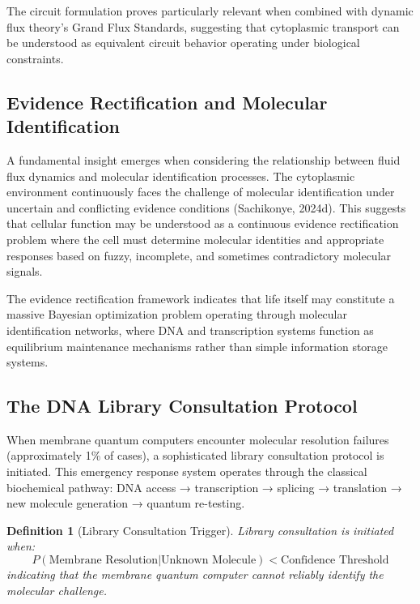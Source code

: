 \documentclass[12pt,a4paper]{article}
\newtheorem{definition}{Definition}
\begin{document}
The circuit formulation proves particularly relevant when combined with dynamic flux theory's Grand Flux Standards, suggesting that cytoplasmic transport can be understood as equivalent circuit behavior operating under biological constraints.

\subsection{Evidence Rectification and Molecular Identification}

A fundamental insight emerges when considering the relationship between fluid flux dynamics and molecular identification processes. The cytoplasmic environment continuously faces the challenge of molecular identification under uncertain and conflicting evidence conditions (Sachikonye, 2024d). This suggests that cellular function may be understood as a continuous evidence rectification problem where the cell must determine molecular identities and appropriate responses based on fuzzy, incomplete, and sometimes contradictory molecular signals.

The evidence rectification framework indicates that life itself may constitute a massive Bayesian optimization problem operating through molecular identification networks, where DNA and transcription systems function as equilibrium maintenance mechanisms rather than simple information storage systems.

\subsection{The DNA Library Consultation Protocol}

When membrane quantum computers encounter molecular resolution failures (approximately 1\% of cases), a sophisticated library consultation protocol is initiated. This emergency response system operates through the classical biochemical pathway: DNA access → transcription → splicing → translation → new molecule generation → quantum re-testing.

\begin{definition}[Library Consultation Trigger]
Library consultation is initiated when:
\begin{equation}
P(\text{Membrane Resolution}|\text{Unknown Molecule}) < \text{Confidence Threshold}
\end{equation}
indicating that the membrane quantum computer cannot reliably identify the molecular challenge.
\end{definition}
\end{document}
